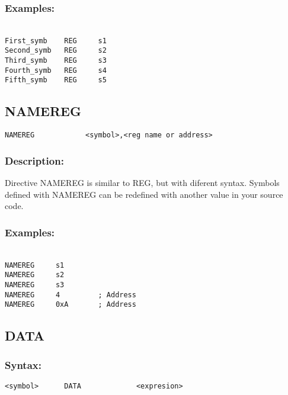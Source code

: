         \subsubsection{Examples:}
            {
            ~\\
            \usecodefont
            \verb'First_symb    REG     s1'\\
            \verb'Second_symb   REG     s2'\\
            \verb'Third_symb    REG     s3'\\
            \verb'Fourth_symb   REG     s4'\\
            \verb'Fifth_symb    REG     s5'\\
            }
            
        \subsection{NAMEREG}
            \verb'NAMEREG            <symbol>,<reg name or address> '
            
        \subsubsection{Description:}
        Directive NAMEREG is similar to REG, but with diferent syntax. Symbols defined with NAMEREG can be redefined with another value in your source
        code.

        \subsubsection{Examples:}
        {
            ~\\
            \usecodefont
            \verb'NAMEREG     s1'\\
            \verb'NAMEREG     s2'\\
            \verb'NAMEREG     s3'\\
            \verb'NAMEREG     4         ; Address'\\
            \verb'NAMEREG     0xA       ; Address'\\
        }


    \subsection{DATA}
        \subsubsection{Syntax:}
            \verb'<symbol>      DATA             <expresion>'
            

